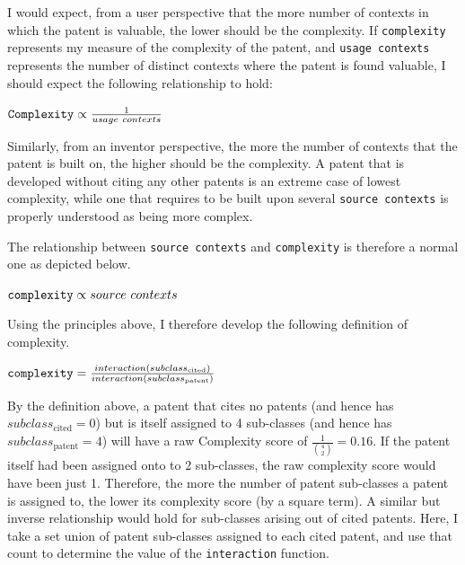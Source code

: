 \documentclass[12pt]{article}
\begin{document}
I would expect, from a user perspective that the more number of contexts in which the patent is valuable, the lower should be the complexity. If \verb|complexity| represents my measure of the complexity of the patent, and \verb|usage contexts| represents the number of distinct contexts where the patent is found valuable, I should expect the following relationship to hold:
\begin{center}$ \verb|Complexity| \propto \frac{1}{usage \ contexts} $ \end{center}
Similarly, from an inventor perspective, the more the number of contexts that the patent is built on, the higher should be the complexity. A patent that is developed without citing any other patents is an extreme case of lowest complexity, while one that requires to be built upon several \verb|source contexts| is properly understood as being more complex. 

The relationship between \verb|source contexts| and \verb|complexity| is therefore a normal one as depicted below.
\begin{center}$ \verb|complexity| \propto source \ contexts $ \end{center} 

Using the principles above, I therefore develop the following definition of complexity.
\begin{center}$ \verb|complexity| = \frac{interaction(subclass_{\text{cited}})}{interaction(subclass_{\text{patent}})} $ \end{center}

By the definition above, a patent that cites no patents (and hence has $subclass_{\text{cited}} = 0$) but is itself assigned to 4 sub-classes (and hence has $subclass_{\text{patent}} = 4$) will have a raw Complexity score of $\frac{1}{\binom{4}{2}} = 0.16$. If the patent itself had been assigned onto to 2 sub-classes, the raw complexity score would have been just 1. Therefore, the more the number of patent sub-classes a patent is assigned to, the lower its complexity score (by a square term). A similar but inverse relationship would hold for sub-classes arising out of cited patents. Here, I take a set union of patent sub-classes assigned to each cited patent, and use that count to determine the value of the \verb|interaction| function.
\end{document}
